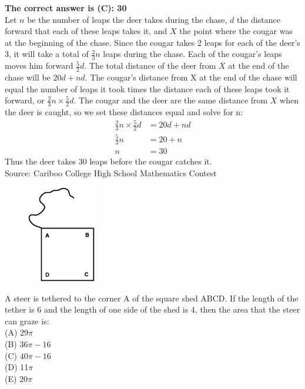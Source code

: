 \documentclass{article}
\begin{document}
\textbf{The correct answer is (C): 30}\\[1 ex]
Let $n$ be the number of leaps the deer takes during the chase, $d$ the distance forward that each of these leaps takes it, and $X$ the point where the cougar was at the beginning of the chase. Since the cougar takes 2 leaps for each of the deer's 3, it will take a total of $\frac{2}{3}n$ leaps during the chase. Each of the cougar's leaps moves him forward $\frac{5}{2}d$. The total distance of the deer from $X$ at the end of the chase will be $20d+nd$. The cougar's distance from X at the end of the chase will equal the number of leaps it took times the distance each of these leaps took it forward, or $\frac{2}{3}n\times \frac{5}{2}d$. The cougar and the deer are the same distance from $X$ when the deer is caught, so we set these distances equal and solve for n:
\begin{align*}
\frac{2}{3}n\times\frac{5}{2}d&=20d+nd\\
\frac{5}{3}n&=20+n\\
n&=30
\end{align*}
Thus the deer takes 30 leaps before the cougar catches it.
\\[5 ex]

\scriptsize
Source: Cariboo College High School Mathematics Contest

\normalsize
\begin{figure}
	\includegraphics[width=30mm]{CCSPR73-23pic1.eps}
\end{figure}
A steer is tethered to the corner A of the square shed ABCD. If the length of the tether is 6 and the length of one side of the shed is 4, then the area that the steer can graze is:\\
(A) 29$\pi$\\
(B) $36\pi-16$\\
(C) $40\pi-16$\\
(D) 11$\pi$\\
(E) $20\pi$\\
\end{document}
